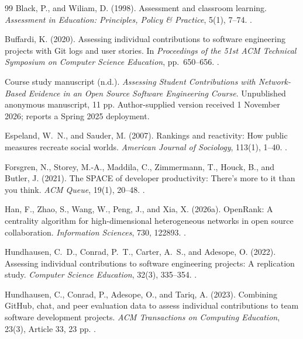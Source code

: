 \begin{thebibliography}{99}
\label{refs:chapter07}
Black, P., and Wiliam, D. (1998).
Assessment and classroom learning.
\emph{Assessment in Education: Principles, Policy \& Practice}, 5(1), 7--74.
.

Buffardi, K. (2020).
Assessing individual contributions to software engineering projects with Git logs and user stories.
In \emph{Proceedings of the 51st ACM Technical Symposium on Computer Science Education}, pp.~650--656.
.

Course study manuscript (n.d.).
\emph{Assessing Student Contributions with Network-Based Evidence in an Open Source Software Engineering Course}.
Unpublished anonymous manuscript, 11 pp. Author-supplied version received 1 November 2026; reports a Spring 2025 deployment.

Espeland, W.~N., and Sauder, M. (2007).
Rankings and reactivity: How public measures recreate social worlds.
\emph{American Journal of Sociology}, 113(1), 1--40.
.

Forsgren, N., Storey, M.-A., Maddila, C., Zimmermann, T., Houck, B., and Butler, J. (2021).
The SPACE of developer productivity: There's more to it than you think.
\emph{ACM Queue}, 19(1), 20--48.
.

Han, F., Zhao, S., Wang, W., Peng, J., and Xia, X. (2026a).
OpenRank: A centrality algorithm for high-dimensional heterogeneous networks in open source collaboration.
\emph{Information Sciences}, 730, 122893.
.

Hundhausen, C.~D., Conrad, P.~T., Carter, A.~S., and Adesope, O. (2022).
Assessing individual contributions to software engineering projects: A replication study.
\emph{Computer Science Education}, 32(3), 335--354.
.

Hundhausen, C., Conrad, P., Adesope, O., and Tariq, A. (2023).
Combining GitHub, chat, and peer evaluation data to assess individual contributions to team software development projects.
\emph{ACM Transactions on Computing Education}, 23(3), Article 33, 23 pp.
.


\end{thebibliography}
